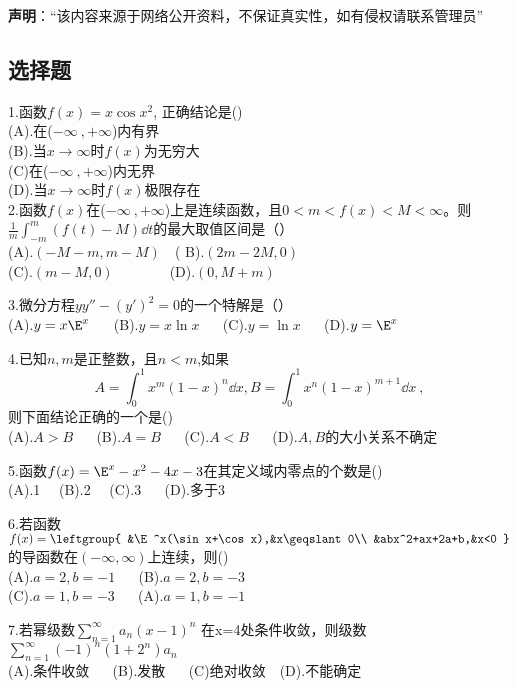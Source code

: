 

\textbf{声明}：“该内容来源于网络公开资料，不保证真实性，如有侵权请联系管理员”

\subsection{选择题}
1.函数$f(x)=x\cos x^2$, 正确结论是()\\
(A).在($-\infty~,+\infty$)内有界\\
(B).当$x\to\infty$时$f(x)$为无穷大\\
(C)在($-\infty~,+\infty$)内无界\\
(D).当$x\to\infty$时$f(x)$极限存在\\

2.函数$f(x)$在($-\infty~,+\infty$)上是连续函数，且$0<m<f(x)<M<\infty$。则
$ \frac{1}{m} \int_{-m}^{m}(f(t)-M )\dd{t}$的最大取值区间是（）\\
(A).$(-M-m,m-M) \quad$( B).$ (2m-2M,0)$\\ (C).$(m-M,0)\qquad \qquad $(D).$(0,M+m)$

3.微分方程$y y''-(y')^2=0$的一个特解是（）\\
(A).$y=x\E^x$ $\quad$ (B).$y=x\ln x$ $\quad$ (C).$y=\ln x$  $\quad$ (D).$y=\E^x$

4.已知$n,m$是正整数，且$n<m$,如果
\begin{equation}
A=\int_{0}^{1} x^m(1-x)^n \dd{x},B=\int_{0}^{1}x^n(1-x)^{m+1} \dd{x}~,
\end{equation}则下面结论正确的一个是()\\
(A).$A>B$ $\quad$ (B).$A=B$ $\quad$ (C).$A<B$ $\quad$ (D).$A,B$的大小关系不确定

5.函数$f(x)=\E^x-x^2-4x-3$在其定义域内零点的个数是()\\
(A).1 $\quad$(B).2 $\quad$(C).3 $\quad$ (D).多于3

6.若函数$f(x)=\leftgroup{
    &\E^x(\sin x+\cos x),&x\geqslant0\\
    &abx^2+ax+2a+b,&x<0
    }$
    的导函数在$(-\infty,\infty)$上连续，则()\\
    (A).$a=2,b=-1$   $\quad$  (B).$a=2,b=-3$   \\
    (C).$a=1,b=-3$   $\quad$   (A).$a=1,b=-1$   

7.若幂级数$\displaystyle \sum_{n=1}^\infty a_n(x-1)^n$ 
在x=4处条件收敛，则级数$\displaystyle \sum_{n=1}^\infty (-1)^n(1+2^n)a_n $\\
(A).条件收敛 $\quad$ (B).发散 $\quad$ (C)绝对收敛$\quad$(D).不能确定

